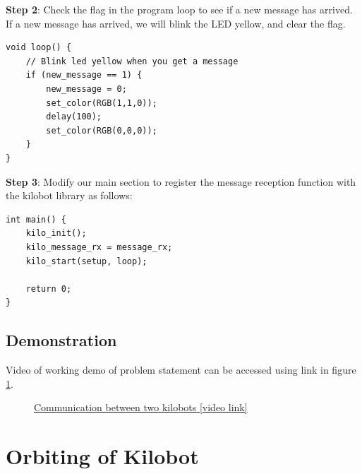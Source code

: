 \documentclass{report}[12pt]
\begin{document}
\noindent \textbf{Step 2}:
Check the flag in the program loop to see if a new message has arrived. If a new message has arrived, we will blink the LED yellow, and clear the flag.

\begin{verbatim}
void loop() {
    // Blink led yellow when you get a message
    if (new_message == 1) {
        new_message = 0;
        set_color(RGB(1,1,0));
        delay(100);
        set_color(RGB(0,0,0));
    }
}
\end{verbatim}
\noindent \textbf{Step 3}:
Modify our main section to register the message reception function with the kilobot library as follows:

\begin{verbatim}
int main() {
    kilo_init();
    kilo_message_rx = message_rx;
    kilo_start(setup, loop);

    return 0;
}
\end{verbatim}
\subsection{Demonstration}
Video of working demo of problem statement can be accessed using link in figure \ref{fig:communication}.
\begin{figure}[H]
	\centering
	\caption{\href{https://photos.app.goo.gl/h2jCY1WrUYU9xLqG8}{Communication between two kilobots [video link]}}
	\label{fig:communication}
\end{figure}

\section{Orbiting of Kilobot}
\end{document}
